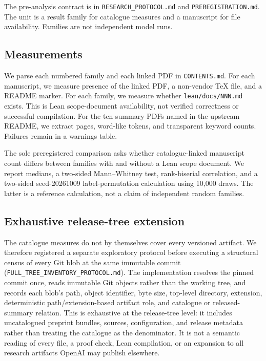 \documentclass[11pt]{article}
\begin{document}
The pre-analysis contract is in \texttt{RESEARCH\_PROTOCOL.md} and
\texttt{PREREGISTRATION.md}. The unit is a result family for catalogue
measures and a manuscript for file availability. Families are not independent
model runs.

\subsection{Measurements}

We parse each numbered family and each linked PDF in \texttt{CONTENTS.md}. For
each manuscript, we measure presence of the linked PDF, a non-vendor TeX file,
and a README marker. For each family, we measure whether
\texttt{lean/docs/NNN.md} exists. This is Lean scope-document availability,
not verified correctness or successful compilation. For the ten summary PDFs
named in the upstream README, we extract pages, word-like tokens, and
transparent keyword counts. Failures remain in a warnings table.

The sole preregistered comparison asks whether catalogue-linked manuscript
count differs between families with and without a Lean scope document. We
report medians, a two-sided Mann--Whitney test, rank-biserial correlation, and
a two-sided seed-20261009 label-permutation calculation using 10,000 draws.
The latter is a reference calculation, not a claim of independent random
families.

\subsection{Exhaustive release-tree extension}

The catalogue measures do not by themselves cover every versioned artifact.
We therefore registered a separate exploratory protocol before executing a
structural census of every Git blob at the same immutable commit
(\texttt{FULL\_TREE\_INVENTORY\_PROTOCOL.md}). The implementation resolves
the pinned commit once, reads immutable Git objects rather than the working
tree, and records each blob's path, object identifier, byte size, top-level
directory, extension, deterministic path/extension-based artifact role, and
catalogue or released-summary relation. This is exhaustive at the release-tree
level: it includes uncatalogued preprint bundles, sources, configuration, and
release metadata rather than treating the catalogue as the denominator. It is
not a semantic reading of every file, a proof check, Lean compilation, or an
expansion to all research artifacts OpenAI may publish elsewhere.
\end{document}
